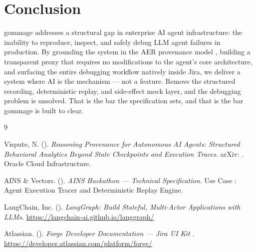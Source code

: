 \documentclass[11pt, a4paper]{article}
\begin{document}
\section{Conclusion}

gommage addresses a structural gap in enterprise AI agent infrastructure: the inability to reproduce, inspect, and safely debug LLM agent failures in production. By grounding the system in the AER provenance model \cite{vispute2026}, building a transparent proxy that requires no modifications to the agent's core architecture, and surfacing the entire debugging workflow natively inside Jira, we deliver a system where AI is the mechanism — not a feature. Remove the structured recording, deterministic replay, and side-effect mock layer, and the debugging problem is unsolved. That is the bar the specification sets, and that is the bar gommage is built to clear.

\vspace{1cm}
\renewcommand{\refname}{\titlefont\Large\bfseries\color{purewhite} References}
\begin{thebibliography}{9}

Vispute, N. (\rmfamily).
\textit{Reasoning Provenance for Autonomous AI Agents: Structured Behavioral Analytics Beyond State Checkpoints and Execution Traces.}
arXiv: \rmfamily [cs.AI]. Oracle Cloud Infrastructure.

AINS  \rmfamily \& Vectors. (\rmfamily).
\textit{AINS Hackathon  \rmfamily — Technical Specification.}
Use Case \rmfamily: Agent Execution Tracer and Deterministic Replay Engine.

LangChain, Inc. (\rmfamily). \textit{LangGraph: Build Stateful, Multi-Actor Applications with LLMs.} \url{https://langchain-ai.github.io/langgraph/}

Atlassian. (\rmfamily). \textit{Forge Developer Documentation — Jira UI Kit \rmfamily.} \url{https://developer.atlassian.com/platform/forge/}

\end{thebibliography}
\end{document}
